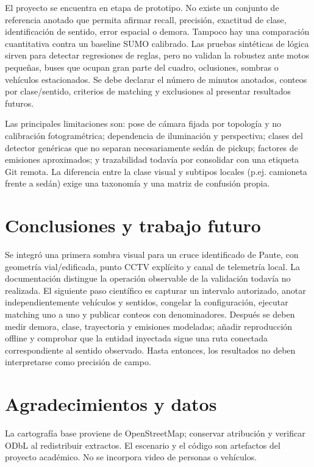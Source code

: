 \documentclass[conference]{IEEEtran}
\begin{document}
El proyecto se encuentra en etapa de prototipo. No existe un conjunto de referencia anotado que permita afirmar recall, precisión, exactitud de clase, identificación de sentido, error espacial o demora. Tampoco hay una comparación cuantitativa contra un baseline SUMO calibrado. Las pruebas sintéticas de lógica sirven para detectar regresiones de reglas, pero no validan la robustez ante motos pequeñas, buses que ocupan gran parte del cuadro, oclusiones, sombras o vehículos estacionados. Se debe declarar el número de minutos anotados, conteos por clase/sentido, criterios de matching y exclusiones al presentar resultados futuros.

Las principales limitaciones son: pose de cámara fijada por topología y no calibración fotogramétrica; dependencia de iluminación y perspectiva; clases del detector genéricas que no separan necesariamente sedán de pickup; factores de emisiones aproximados; y trazabilidad todavía por consolidar con una etiqueta Git remota. La diferencia entre la clase visual y subtipos locales (p.ej. camioneta frente a sedán) exige una taxonomía y una matriz de confusión propia.

\section{Conclusiones y trabajo futuro}
Se integró una primera sombra visual para un cruce identificado de Paute, con geometría vial/edificada, punto CCTV explícito y canal de telemetría local. La documentación distingue la operación observable de la validación todavía no realizada. El siguiente paso científico es capturar un intervalo autorizado, anotar independientemente vehículos y sentidos, congelar la configuración, ejecutar matching uno a uno y publicar conteos con denominadores. Después se deben medir demora, clase, trayectoria y emisiones modeladas; añadir reproducción offline y comprobar que la entidad inyectada sigue una ruta conectada correspondiente al sentido observado. Hasta entonces, los resultados no deben interpretarse como precisión de campo.

\section*{Agradecimientos y datos}
La cartografía base proviene de OpenStreetMap; conservar atribución y verificar ODbL al redistribuir extractos. El escenario y el código son artefactos del proyecto académico. No se incorpora video de personas o vehículos.


\end{document}
